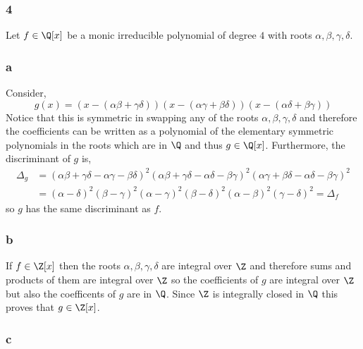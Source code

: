 \documentclass[12pt]{article}
\begin{document}
\subsubsection{4}

Let $f \in \Q[x]$ be a monic irreducible polynomial of degree $4$ with roots $\alpha, \beta, \gamma, \delta$. 

\subsubsection{a}

Consider,
\[ g(x) = (x - (\alpha \beta + \gamma \delta))(x - (\alpha \gamma + \beta \delta))(x - (\alpha \delta + \beta \gamma)) \]
Notice that this is symmetric in swapping any of the roots $\alpha, \beta, \gamma, \delta$ and therefore the coefficients can be written as a polynomial of the elementary symmetric polynomials in the roots which are in $\Q$ and thus $g \in \Q[x]$. Furthermore, the discriminant of $g$ is,
\begin{align*}
\Delta_g & = (\alpha \beta + \gamma \delta - \alpha \gamma - \beta \delta)^2 (\alpha \beta + \gamma \delta - \alpha \delta - \beta \gamma)^2 (\alpha \gamma + \beta \delta - \alpha \delta - \beta \gamma)^2
\\
& = (\alpha - \delta)^2 (\beta - \gamma)^2 (\alpha - \gamma)^2 (\beta - \delta)^2 (\alpha - \beta)^2 (\gamma - \delta)^2 = \Delta_f 
\end{align*}
so $g$ has the same discriminant as $f$.

\subsubsection{b}

If $f \in \Z[x]$ then the roots $\alpha, \beta, \gamma, \delta$ are integral over $\Z$ and therefore sums and products of them are integral over $\Z$ so the coefficients of $g$ are integral over $\Z$ but also the coefficents of $g$ are in $\Q$. Since $\Z$ is integrally closed in $\Q$ this proves that $g \in \Z[x]$. 

\subsubsection{c}
\end{document}
